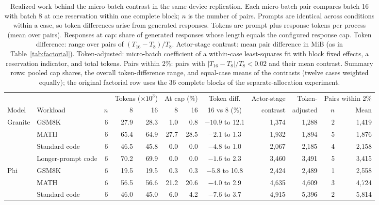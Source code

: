 \begin{table}[!htbp]
\centering
\caption{Realized work behind the micro-batch contrast in the same-device replication.
Each micro-batch pair compares batch 16 with batch 8 at one reservation within one complete
block; \(n\) is the number of pairs. Prompts are identical across conditions within a case,
so token differences arise from generated responses. Tokens are prompt plus response tokens
per process (mean over pairs). Responses at cap: share of generated responses whose length
equals the configured response cap. Token difference: range over pairs of
\((T_{16}-T_{8})/T_{8}\). Actor-stage contrast: mean pair difference in MiB (as in
Table~\ref{tab:factorial}). Token-adjusted: micro-batch coefficient of a within-case
least-squares fit with block fixed effects, a reservation indicator, and total tokens.
Pairs within 2\%: pairs with \(|T_{16}-T_{8}|/T_{8}<0.02\) and their mean contrast.
Summary rows: pooled cap shares, the overall token-difference range, and equal-case means
of the contrasts (twelve cases weighted equally); the original factorial row uses the 36
complete blocks of the separate-allocation experiment.}
\label{tab:si-realized-work}
\footnotesize
\setlength{\tabcolsep}{2.5pt}
\begin{tabular*}{\linewidth}{@{\extracolsep{\fill}}llrrrrrcrrrr@{}}
\toprule
 & & & \multicolumn{2}{c}{Tokens (\(\times 10^3\))} & \multicolumn{2}{c}{At cap (\%)} & Token diff. & Actor-stage & Token- & \multicolumn{2}{c}{Pairs within 2\%} \\
\cmidrule(lr){4-5}\cmidrule(lr){6-7}\cmidrule(lr){11-12}
Model & Workload & \(n\) & 8 & 16 & 8 & 16 & 16 vs 8 (\%) & contrast & adjusted & \(n\) & Mean \\
\midrule
Granite & GSM8K & 6 & 27.9 & 28.3 & 1.0 & 0.8 & \(-10.9\) to 12.1 & 1,374 & 1,288 & 2 & 1,419 \\
 & MATH & 6 & 65.4 & 64.9 & 27.7 & 28.5 & \(-2.1\) to 1.3 & 1,932 & 1,894 & 5 & 1,876 \\
 & Standard code & 6 & 46.5 & 45.8 & 0.0 & 0.0 & \(-4.8\) to 1.0 & 2,067 & 2,185 & 4 & 2,158 \\
 & Longer-prompt code & 6 & 70.2 & 69.9 & 0.0 & 0.0 & \(-1.6\) to 2.3 & 3,460 & 3,491 & 5 & 3,415 \\
\addlinespace[3pt]
Phi & GSM8K & 6 & 19.5 & 19.5 & 0.3 & 0.3 & \(-5.8\) to 10.8 & 2,424 & 2,489 & 1 & 2,558 \\
 & MATH & 6 & 56.5 & 56.6 & 21.2 & 20.6 & \(-4.0\) to 2.9 & 4,635 & 4,609 & 3 & 4,724 \\
 & Standard code & 6 & 46.0 & 45.0 & 6.0 & 4.2 & \(-7.6\) to 3.7 & 4,915 & 5,396 & 2 & 5,814 \\

\end{tabular*}
\end{table}
